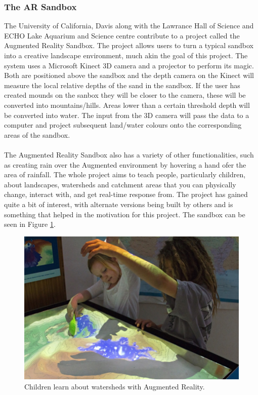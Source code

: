\documentclass[11pt]{article}
\begin{document}
\subsubsection{The AR Sandbox}
The University of California, Davis along with the Lawrance Hall of Science 
and ECHO Lake Aquarium and Science centre contribute to a project called the
Augmented Reality Sandbox\cite{Reed14}. The project allows users to turn a 
typical sandbox
into a creative landscape environment, much akin the goal of this project.
The system uses a Microsoft Kinect 3D camera and a projector to perform its 
magic. Both are positioned above the sandbox and the depth camera on the Kinect
will measure the local relative depths of the sand in the sandbox. If the
user has created mounds on the sanbox they will  be closer to the camera, these
will be converted into mountains/hills. Areas lower than a certain threshold 
depth will be converted into water. The input from the 3D camera will pass 
the data to a computer and project subsequent land/water colours onto the
corresponding areas of the sandbox.\\
\\
The Augmented Reality Sandbox also has a variety of other functionalities, such
as creating rain over the Augmented environment by hovering a hand ofer the 
area of rainfall. The whole project aims to teach people, particularly children,
about landscapes, watersheds and catchment areas that you can physically 
change, interact with, and get real-time response from. The project has gained 
quite a bit of interest, with alternate versions being built by others and
is something that helped in the motivation for this project. The sandbox
can be seen in Figure \ref{arsandbox}. \\

\begin{figure}[!Ht]
	\centering
	\includegraphics[scale=0.8]{pics/sandbox.jpg}
	\caption{Children learn about watersheds with Augmented Reality.}
	\label{arsandbox}
\end{figure}
\end{document}
